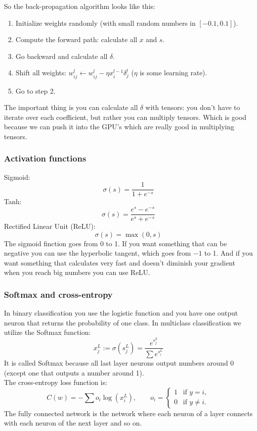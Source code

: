 So the back-propagation algorithm looks like this:
\begin{enumerate}[label=\arabic*.]
  \item Initialize weights randomly (with small random numbers in $[-0.1,0.1]$).
  \item Compute the forward path: calculate all $x$ and $s$.
  \item Go backward and calculate all $\delta$.
  \item Shift all weights: $w_{ij}^l\leftarrow w_{ij}^l-\eta x_i^{l-1}\delta_j^l$ ($\eta$ is some learning rate).
  \item Go to step 2.
\end{enumerate}
The important thing is you can calculate all $\delta$ with tensors: you don't have to iterate over each coefficient, but rather you can multiply tensors. Which is good because we can push it into the GPU's which are really good in multiplying tensors.

\subsubsection*{Activation functions}

Sigmoid: 
$$\sigma(s)=\frac{1}{1+e^{-s}}$$
Tanh:
$$\sigma(s)=\frac{e^s-e^{-s}}{e^s+e^{-s}}$$
Rectified Linear Unit (ReLU):
$$\sigma(s)=\max(0,s)$$
The sigmoid finction goes from 0 to 1. If you want something that can be negative you can use the hyperbolic tangent, which goes from $-1$ to 1. And if you want something that calculates very fast and doesn't diminish your gradient when you reach big numbers you can use ReLU.

\subsubsection*{Softmax and cross-entropy}

In binary classification you use the logistic function and you have one output neuron that returns the probability of one class. In multiclass classification we utilize the Softmax function:
$$x_j^L:=\sigma(s_j^L)=\frac{e^{s_j^L}}{\sum e^{s_i^L}}$$
It is called Softmax because all last layer neurons output numbers around 0 (except one that outputs a number around 1).\\
The cross-entropy loss function is:
$$C(w)=-\sum o_i\log(x_i^L),\qquad o_i=\begin{cases}
1&\text{if }y=i,\\
0&\text{if }y\ne i.
\end{cases}$$
The fully connected network is the network where each neuron of a layer connects with each neuron of the next layer and so on.

